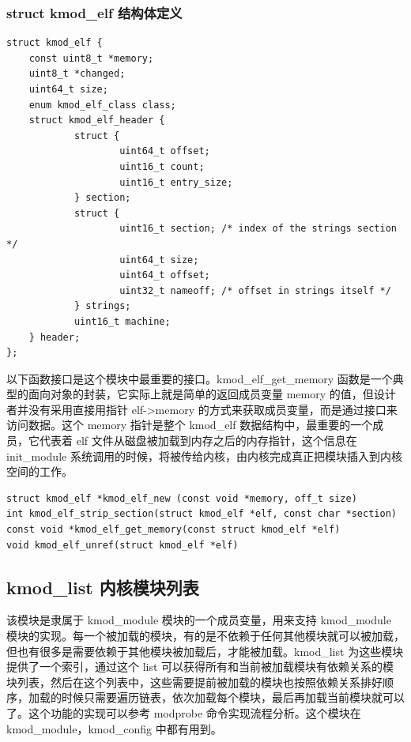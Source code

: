 \subsubsection{struct kmod\_elf 结构体定义}

{\begin{shaded}\begin{verbatim}
struct kmod_elf {
    const uint8_t *memory;
    uint8_t *changed;
    uint64_t size;
    enum kmod_elf_class class;
    struct kmod_elf_header {
            struct {
                    uint64_t offset;
                    uint16_t count;
                    uint16_t entry_size;
            } section;
            struct {
                    uint16_t section; /* index of the strings section */
                    uint64_t size;
                    uint64_t offset;
                    uint32_t nameoff; /* offset in strings itself */
            } strings;   
            uint16_t machine;
    } header;    
};
\end{verbatim}\end{shaded}}
以下函数接口是这个模块中最重要的接口。kmod\_elf\_get\_memory
函数是一个典型的面向对象的封装，它实际上就是简单的返回成员变量 memory
的值，但设计者并没有采用直接用指针 elf-\textgreater{}memory
的方式来获取成员变量，而是通过接口来访问数据。这个 memory 指针是整个
kmod\_elf 数据结构中，最重要的一个成员，它代表着 elf
文件从磁盘被加载到内存之后的内存指针，这个信息在 init\_module
系统调用的时候，将被传给内核，由内核完成真正把模块插入到内核空间的工作。

{\begin{shaded}\begin{verbatim}
struct kmod_elf *kmod_elf_new (const void *memory, off_t size)
int kmod_elf_strip_section(struct kmod_elf *elf, const char *section)
const void *kmod_elf_get_memory(const struct kmod_elf *elf)
void kmod_elf_unref(struct kmod_elf *elf)
\end{verbatim}\end{shaded}}
\subsection{kmod\_list 内核模块列表}

该模块是隶属于 kmod\_module 模块的一个成员变量，用来支持 kmod\_module
模块的实现。每一个被加载的模块，有的是不依赖于任何其他模块就可以被加载，但也有很多是需要依赖于其他模块被加载后，才能被加载。kmod\_list
为这些模块提供了一个索引，通过这个 list
可以获得所有和当前被加载模块有依赖关系的模块列表，然后在这个列表中，这些需要提前被加载的模块也按照依赖关系排好顺序，加载的时候只需要遍历链表，依次加载每个模块，最后再加载当前模块就可以了。这个功能的实现可以参考
modprobe 命令实现流程分析。这个模块在 kmod\_module，kmod\_config
中都有用到。

